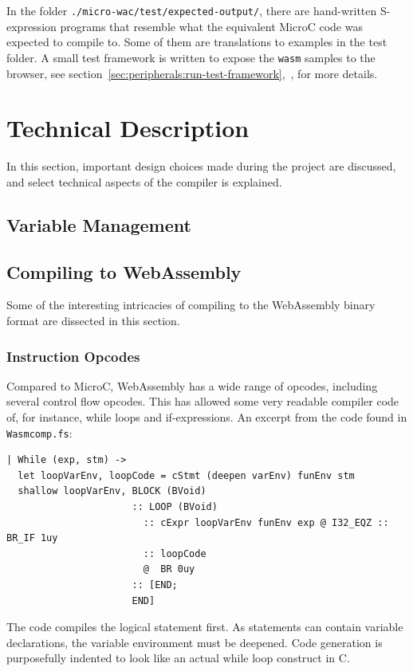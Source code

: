 \documentclass[a4paper]{article}
\begin{document}
In the folder \texttt{./micro-wac/test/expected-output/}, there are hand-written S-expression programs that resemble what the equivalent MicroC code was expected to compile to. Some of them are translations to examples in the test folder. A small test framework is written to expose the \texttt{wasm} samples to the browser, see section~\ref{sec:peripherals:run-test-framework},~, for more details.

\newpage
\section{Technical Description}
\label{sec:technical}
In this section, important design choices made during the project are discussed, and select technical aspects of the compiler is explained.



\subsection{Variable Management}
\label{sec:technical:variables}

\subsection{Compiling to WebAssembly}
\label{sec:technical:webassembly}
Some of the interesting intricacies of compiling to the WebAssembly binary format are dissected in this section.

\subsubsection{Instruction Opcodes}
Compared to MicroC, WebAssembly has a wide range of opcodes, including several control flow opcodes. This has allowed some very readable compiler code of, for instance, while loops and if-expressions.
An excerpt from the code found in \texttt{Wasmcomp.fs}:
\begin{verbatim}
| While (exp, stm) ->
  let loopVarEnv, loopCode = cStmt (deepen varEnv) funEnv stm
  shallow loopVarEnv, BLOCK (BVoid)
                      :: LOOP (BVoid)
                        :: cExpr loopVarEnv funEnv exp @ I32_EQZ :: BR_IF 1uy
                        :: loopCode
                        @  BR 0uy
                      :: [END;
                      END]
\end{verbatim}

The code compiles the logical statement first. As statements can contain variable declarations, the variable environment must be deepened. Code generation is purposefully indented to look like an actual while loop construct in C.
\end{document}
